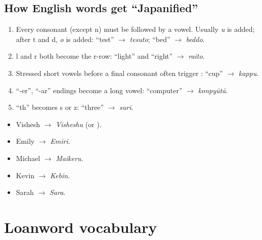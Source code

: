 \subsection{How English words get ``Japanified''}
\begin{enumerate}
  \item Every consonant (except n) must be followed by a vowel. Usually \emph{u} is added;
        after t and d, \emph{o} is added: ``test'' $\to$  \emph{tesuto};
        ``bed'' $\to$  \emph{beddo}.
  \item l and r both become the r-row: ``light'' and ``right'' $\to$ 
        \emph{raito}.
  \item Stressed short vowels before a final consonant often trigger : ``cup''
        $\to$  \emph{kappu}.
  \item ``-er'', ``-ar'' endings become a long vowel: ``computer'' $\to$
         \emph{konpyūtā}.
  \item ``th'' becomes s or z: ``three'' $\to$  \emph{surī}.
\end{enumerate}

\begin{example}
\leavevmode
\begin{itemize}
  \item Vishesh $\to$  \emph{Visheshu} (or ).
  \item Emily $\to$  \emph{Emirī}.
  \item Michael $\to$  \emph{Maikeru}.
  \item Kevin $\to$  \emph{Kebin}.
  \item Sarah $\to$  \emph{Sara}.
\end{itemize}
\end{example}

\section{Loanword vocabulary}

